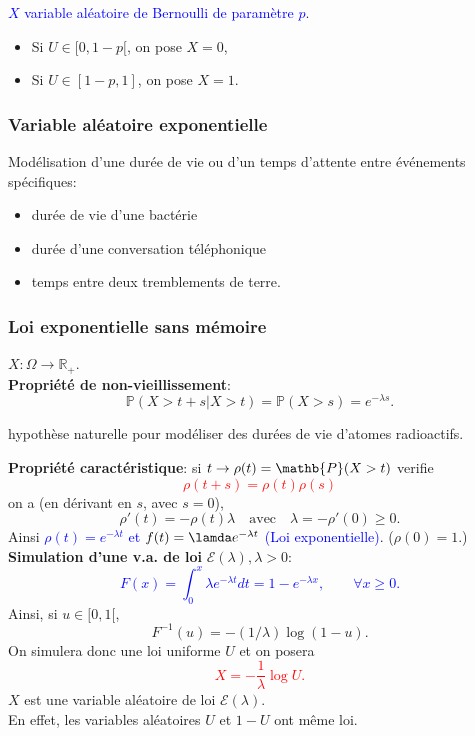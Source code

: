 \begin{example}
\textcolor{blue}{ $X$ variable aléatoire de Bernoulli de paramètre $p$}.
\begin{itemize}
\item Si $U\in[0,1-p[$, on pose $X=0$,
\item Si $U\in[1-p,1]$, on pose $X=1$.
\end{itemize}
\end{example}

\subsubsection{Variable aléatoire exponentielle}
\theoremstyle{definition}

Modélisation d’une durée de vie ou d’un temps d’attente entre
événements spécifiques:
\begin{itemize}
\item durée de vie d’une bactérie
\item durée d’une conversation téléphonique
\item temps entre deux tremblements de terre.
\end{itemize}

\subsubsection{Loi exponentielle sans mémoire}
$X:\Omega\rightarrow\mathbb{R}_{+}.$\\
\textbf{Propriété de non-vieillissement}:$$\mathbb{P}(X>t+s|X>t)=\mathbb{P}(X>s)=e^{-\lambda s}.$$
\begin{example}
hypothèse naturelle pour modéliser des durées de vie d’atomes
radioactifs.
\end{example}

\vskip 1cm

\textbf{Propriété caractéristique}: si $t\rightarrow\rho(t)=\mathb{P}(X>t)$ verifie
\textcolor{red}{$$\rho(t+s)=\rho(t)\rho(s)$$}
on a (en dérivant en $s$, avec $s = 0$),
$$\rho'(t)=-\rho(t)\lambda \quad\mathrm{  avec  }\quad \lambda=-\rho'(0)\geq0.$$
Ainsi \textcolor{blue}{$\rho(t)=e^{-\lambda t}$ et $f(t)=\lamda e^{-\lambda t}$ (Loi exponentielle)}. ($\rho(0)=1$.)
\vskip 1cm
\textbf{Simulation d’une v.a. de loi} $\mathcal{E}(\lambda), \lambda>0$:
\textcolor{blue}{$$F(x)=\int_{0}^{x}\lambda e^{-\lambda t}dt=1-e^{-\lambda x},\quad\mathrm{  }\quad\forall x\geq0.$$}
Ainsi, si $u\in[0,1[$,$$F^{-1}(u)=-(1/\lambda)\log(1-u).$$
On simulera donc une loi uniforme $U$ et on posera \textcolor{red}{$$X=-\frac{1}{\lambda}\log U.$$}
$X$ est une variable aléatoire de loi $\mathcal{E}(\lambda)$.\\
En effet, les variables aléatoires $U$ et $1-U$ ont même loi.

